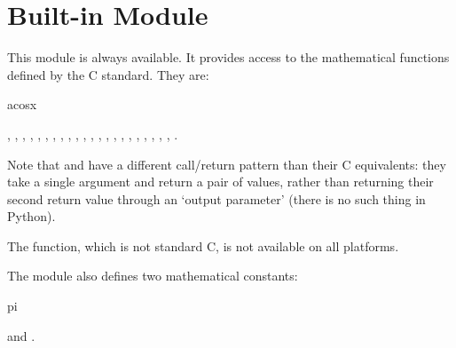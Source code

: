 \section{Built-in Module }

\renewcommand{\indexsubitem}{(in module math)}
This module is always available.
It provides access to the mathematical functions defined by the C
standard.
They are:
\iftexi
\begin{funcdesc}{acos}{x}
\end{funcdesc}
\else
{},
,
,
,
,
,
,
,
,
,
,
,
,
,
,
,
,
,
,
,
,
,
.
\fi

Note that  and  have a different call/return
pattern than their C equivalents: they take a single argument and
return a pair of values, rather than returning their second return
value through an `output parameter' (there is no such thing in Python).

The  function, which is not standard C, is not available
on all platforms.

The module also defines two mathematical constants:
\iftexi
\begin{datadesc}{pi}
\end{datadesc}
\else
{} and .
\fi
